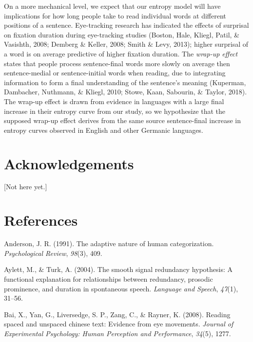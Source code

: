 \documentclass[10pt, letterpaper]{article}
\begin{document}
On a more mechanical level, we expect that our entropy model will have
implications for how long people take to read individual words at
different positions of a sentence. Eye-tracking research has indicated
the effects of surprisal on fixation duration during eye-tracking
studies (Boston, Hale, Kliegl, Patil, \& Vasishth, 2008; Demberg \&
Keller, 2008; Smith \& Levy, 2013); higher surprisal of a word is on
average predictive of higher fixation duration. The \emph{wrap-up
effect} states that people process sentence-final words more slowly on
average then sentence-medial or sentence-initial words when reading, due
to integrating information to form a final understanding of the
sentence's meaning (Kuperman, Dambacher, Nuthmann, \& Kliegl, 2010;
Stowe, Kaan, Sabourin, \& Taylor, 2018). The wrap-up effect is drawn
from evidence in languages with a large final increase in their entropy
curve from our study, so we hypothesize that the supposed wrap-up effect
derives from the same source sentence-final increase in entropy curves
observed in English and other Germanic languages.

\hypertarget{acknowledgements}{%
\section{Acknowledgements}\label{acknowledgements}}

{[}Not here yet.{]}

\hypertarget{references}{%
\section{References}\label{references}}

\setlength{\parindent}{-0.1in} 
\setlength{\leftskip}{0.125in}

\noindent

\hypertarget{refs}{}
\leavevmode\hypertarget{ref-anderson1991}{}%
Anderson, J. R. (1991). The adaptive nature of human categorization.
\emph{Psychological Review}, \emph{98}(3), 409.

\leavevmode\hypertarget{ref-aylett2004}{}%
Aylett, M., \& Turk, A. (2004). The smooth signal redundancy hypothesis:
A functional explanation for relationships between redundancy, prosodic
prominence, and duration in spontaneous speech. \emph{Language and
Speech}, \emph{47}(1), 31--56.

\leavevmode\hypertarget{ref-bai2008}{}%
Bai, X., Yan, G., Liversedge, S. P., Zang, C., \& Rayner, K. (2008).
Reading spaced and unspaced chinese text: Evidence from eye movements.
\emph{Journal of Experimental Psychology: Human Perception and
Performance}, \emph{34}(5), 1277.
\end{document}
